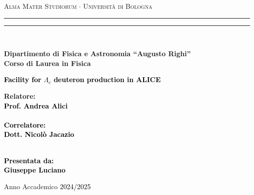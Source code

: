 \documentclass[12pt,a4paper]{book}
\begin{document}
	\begin{titlepage}
		\begin{center}
			{{\Large{\textsc{Alma Mater Studiorum $\cdot$ Universit\`a di Bologna}}}} 
			\rule[0.1cm]{15.8cm}{0.1mm}
			\rule[0.5cm]{15.8cm}{0.6mm}
			\\\vspace{3mm}
			
			{\small{\bf Dipartimento di Fisica e Astronomia “Augusto Righi”\\
					Corso di Laurea in Fisica}}
			
		\end{center}
		
		\vspace{23mm}
		
		\begin{center}\textcolor{black}{
				{\LARGE{\bf Facility for $\Lambda_c$ deuteron production in ALICE}}\\
		}\end{center}
		
		\vspace{50mm} \par \noindent
		
		\begin{minipage}[t]{0.47\textwidth}
			{\large{\bf Relatore: \vspace{2mm}\\\textcolor{black}{
						Prof. Andrea Alici}\\\\
					\textcolor{black}{
						\bf Correlatore: 
						\vspace{2mm}\\
						Dott. Nicolò Jacazio \\\\}}}
		\end{minipage}
		\hfill
		\begin{minipage}[t]{0.47\textwidth}\raggedleft \textcolor{black}{
				{\large{\bf Presentata da:
						\vspace{2mm}\\
						Giuseppe Luciano}}}
		\end{minipage}
		
		\vspace{40mm}
		
		\begin{center}
			Anno Accademico \textcolor{black}{ 2024/2025}
		\end{center}
		
	\end{titlepage}
	\newpage
	
\end{document}
